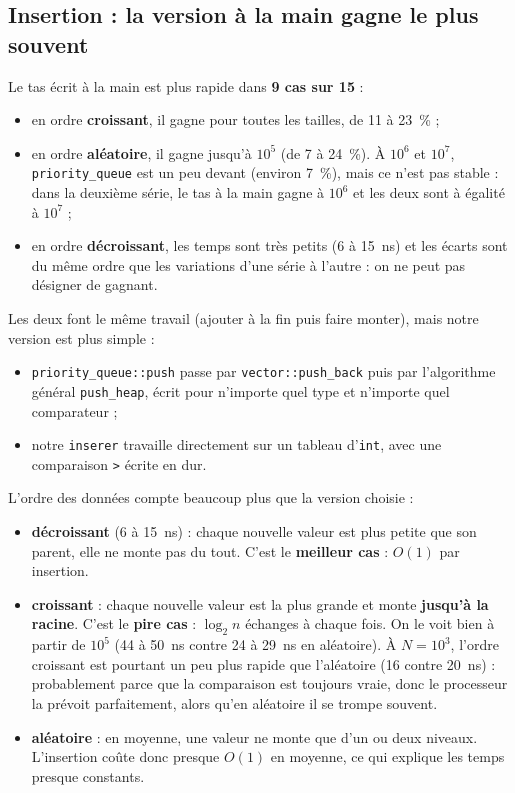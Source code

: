 \documentclass[12pt,a4paper]{report}
\begin{document}
\subsection{Insertion : la version à la main gagne le plus souvent}
Le tas écrit à la main est plus rapide dans \textbf{9 cas sur 15} :
\begin{itemize}
  \item en ordre \textbf{croissant}, il gagne pour toutes les tailles, de 11 à 23~\% ;
  \item en ordre \textbf{aléatoire}, il gagne jusqu'à $10^5$ (de 7 à 24~\%). À $10^6$ et $10^7$, \texttt{priority\_queue} est un peu devant (environ 7~\%), mais ce n'est pas stable : dans la deuxième série, le tas à la main gagne à $10^6$ et les deux sont à égalité à $10^7$ ;
  \item en ordre \textbf{décroissant}, les temps sont très petits (6 à 15~ns) et les écarts sont du même ordre que les variations d'une série à l'autre : on ne peut pas désigner de gagnant.
\end{itemize}
Les deux font le même travail (ajouter à la fin puis faire monter), mais notre version est plus simple :
\begin{itemize}
  \item \texttt{priority\_queue::push} passe par \texttt{vector::push\_back} puis par l'algorithme général \texttt{push\_heap}, écrit pour n'importe quel type et n'importe quel comparateur ;
  \item notre \texttt{inserer} travaille directement sur un tableau d'\texttt{int}, avec une comparaison \texttt{>} écrite en dur.
\end{itemize}
L'ordre des données compte beaucoup plus que la version choisie :
\begin{itemize}
  \item \textbf{décroissant} (6 à 15~ns) : chaque nouvelle valeur est plus petite que son parent, elle ne monte pas du tout. C'est le \textbf{meilleur cas} : $O(1)$ par insertion.
  \item \textbf{croissant} : chaque nouvelle valeur est la plus grande et monte \textbf{jusqu'à la racine}. C'est le \textbf{pire cas} : $\log_2 n$ échanges à chaque fois. On le voit bien à partir de $10^5$ (44 à 50~ns contre 24 à 29~ns en aléatoire). À $N=10^3$, l'ordre croissant est pourtant un peu plus rapide que l'aléatoire (16 contre 20~ns) : probablement parce que la comparaison est toujours vraie, donc le processeur la prévoit parfaitement, alors qu'en aléatoire il se trompe souvent.
  \item \textbf{aléatoire} : en moyenne, une valeur ne monte que d'un ou deux niveaux. L'insertion coûte donc presque $O(1)$ en moyenne, ce qui explique les temps presque constants.
\end{itemize}
\end{document}
